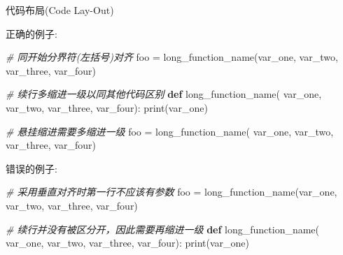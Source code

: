 \documentclass[ignorenonframetext,9pt]{beamer}
\newenvironment{Shaded}{}{}
\newcommand{\BuiltInTok}[1]{#1}
\newcommand{\CommentTok}[1]{\textcolor[rgb]{0.38,0.63,0.69}{\textit{#1}}}
\newcommand{\KeywordTok}[1]{\textcolor[rgb]{0.00,0.44,0.13}{\textbf{#1}}}
\newcommand{\NormalTok}[1]{#1}
\newcommand{\OperatorTok}[1]{\textcolor[rgb]{0.40,0.40,0.40}{#1}}
\begin{document}
\begin{frame}{代码布局(Code Lay-Out)}
\protect\hypertarget{ux4ee3ux7801ux5e03ux5c40code-lay-out}{}


\end{frame}

\begin{frame}[fragile]

正确的例子:

\begin{Shaded}
\begin{Highlighting}[]
\CommentTok{# 同开始分界符(左括号)对齐}
\NormalTok{foo }\OperatorTok{=}\NormalTok{ long_function_name(var_one, var_two,}
\NormalTok{                         var_three, var_four)}

\CommentTok{# 续行多缩进一级以同其他代码区别}
\KeywordTok{def}\NormalTok{ long_function_name(}
\NormalTok{        var_one, var_two, var_three,}
\NormalTok{        var_four):}
    \BuiltInTok{print}\NormalTok{(var_one)}

\CommentTok{# 悬挂缩进需要多缩进一级}
\NormalTok{foo }\OperatorTok{=}\NormalTok{ long_function_name(}
\NormalTok{    var_one, var_two,}
\NormalTok{    var_three, var_four)}
\end{Highlighting}
\end{Shaded}

\end{frame}

\begin{frame}[fragile]

错误的例子:

\begin{Shaded}
\begin{Highlighting}[]
\CommentTok{# 采用垂直对齐时第一行不应该有参数}
\NormalTok{foo }\OperatorTok{=}\NormalTok{ long_function_name(var_one, var_two,}
\NormalTok{    var_three, var_four)}

\CommentTok{# 续行并没有被区分开，因此需要再缩进一级}
\KeywordTok{def}\NormalTok{ long_function_name(}
\NormalTok{    var_one, var_two, var_three,}
\NormalTok{    var_four):}
    \BuiltInTok{print}\NormalTok{(var_one)}
\end{Highlighting}
\end{Shaded}

\end{frame}
\end{document}

